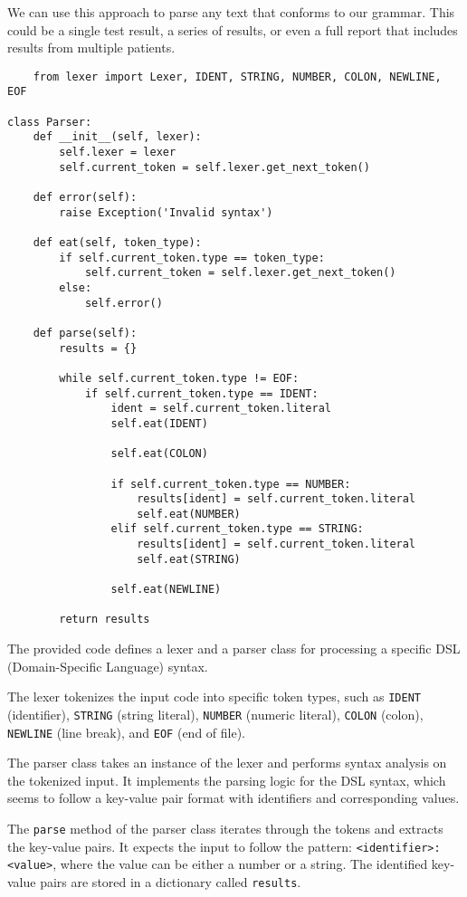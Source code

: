 We can use this approach to parse any text that conforms to our grammar. This could be a single test result, a series of results, or even a full report that includes results from multiple patients.
\begin{lstlisting}
    from lexer import Lexer, IDENT, STRING, NUMBER, COLON, NEWLINE, EOF

class Parser:
    def __init__(self, lexer):
        self.lexer = lexer
        self.current_token = self.lexer.get_next_token()

    def error(self):
        raise Exception('Invalid syntax')

    def eat(self, token_type):
        if self.current_token.type == token_type:
            self.current_token = self.lexer.get_next_token()
        else:
            self.error()

    def parse(self):
        results = {}

        while self.current_token.type != EOF:
            if self.current_token.type == IDENT:
                ident = self.current_token.literal
                self.eat(IDENT)

                self.eat(COLON)

                if self.current_token.type == NUMBER:
                    results[ident] = self.current_token.literal
                    self.eat(NUMBER)
                elif self.current_token.type == STRING:
                    results[ident] = self.current_token.literal
                    self.eat(STRING)

                self.eat(NEWLINE)

        return results
\end{lstlisting}

The provided code defines a lexer and a parser class for processing a specific DSL (Domain-Specific Language) syntax.

The lexer tokenizes the input code into specific token types, such as \texttt{IDENT} (identifier), \texttt{STRING} (string literal), \texttt{NUMBER} (numeric literal), \texttt{COLON} (colon), \texttt{NEWLINE} (line break), and \texttt{EOF} (end of file).

The parser class takes an instance of the lexer and performs syntax analysis on the tokenized input. It implements the parsing logic for the DSL syntax, which seems to follow a key-value pair format with identifiers and corresponding values.

The \texttt{parse} method of the parser class iterates through the tokens and extracts the key-value pairs. It expects the input to follow the pattern: \texttt{<identifier>: <value>}, where the value can be either a number or a string. The identified key-value pairs are stored in a dictionary called \texttt{results}.

